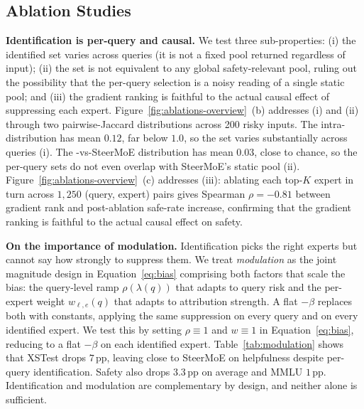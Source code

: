 \subsection{Ablation Studies}
\label{sec:ablations}
\noindent\textbf{Identification is per-query and causal.}
We test three sub-properties: (i) the identified set varies across queries (it is not a fixed pool returned regardless of input); (ii) the set is not equivalent to any global safety-relevant pool, ruling out the possibility that the per-query selection is a noisy reading of a single static pool; and (iii) the gradient ranking is faithful to the actual causal effect of suppressing each expert.
Figure~\ref{fig:ablations-overview}~(b) addresses (i) and (ii) through two pairwise-Jaccard distributions across 200 risky inputs. The intra-\name distribution has mean $0.12$, far below $1.0$, so the set varies substantially across queries (i). The \name-vs-SteerMoE distribution has mean $0.03$, close to chance, so the per-query sets do not even overlap with SteerMoE's static pool (ii). Figure~\ref{fig:ablations-overview}~(c) addresses (iii): ablating each top-$K$ expert in turn across $1{,}250$ (query, expert) pairs gives Spearman $\rho = -0.81$ between gradient rank and post-ablation safe-rate increase, confirming that the gradient ranking is faithful to the actual causal effect on safety.

\begin{table}
\vspace{-1em}

\vspace{-1em}
\end{table}

\noindent\textbf{On the importance of modulation.}
Identification picks the right experts but cannot say how strongly to suppress them. We treat \emph{modulation} as the joint magnitude design in Equation~\ref{eq:bias} comprising both factors that scale the bias: the query-level ramp $\rho(\lambda(q))$ that adapts to query risk and the per-expert weight $w_{\ell,e}(q)$ that adapts to attribution strength. A flat $-\beta$ replaces both with constants, applying the same suppression on every query and on every identified expert.
We test this by setting $\rho \equiv 1$ and $w \equiv 1$ in Equation~\ref{eq:bias}, reducing \name to a flat $-\beta$ on each identified expert. Table~\ref{tab:modulation} shows that XSTest drops $7$\,pp, leaving \name close to SteerMoE on helpfulness despite per-query identification. Safety also drops $3.3$\,pp on average and MMLU $1$\,pp. Identification and modulation are complementary by design, and neither alone is sufficient.


